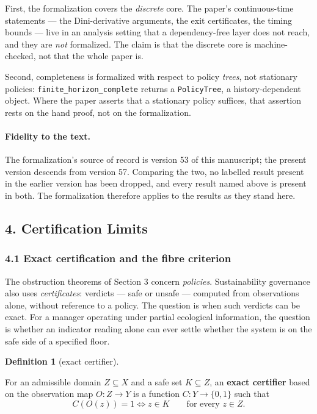 \documentclass[10pt,twocolumn]{article}
\theoremstyle{definition}
\newtheorem{definition}{Definition}
\begin{document}
First, the formalization covers the \emph{discrete} core. The paper's continuous-time
statements --- the Dini-derivative arguments, the exit certificates, the timing bounds
--- live in an analysis setting that a dependency-free layer does not reach, and they are
\emph{not} formalized. The claim is that the discrete core is machine-checked, not that
the whole paper is.

Second, completeness is formalized with respect to policy \emph{trees}, not stationary
policies: \texttt{finite\_horizon\_complete} returns a \texttt{PolicyTree}, a
history-dependent object. Where the paper asserts that a stationary policy suffices,
that assertion rests on the hand proof, not on the formalization.

\paragraph{Fidelity to the text.} The formalization's source of record is version 53 of
this manuscript; the present version descends from version 57. Comparing the two, no
labelled result present in the earlier version has been dropped, and every result named
above is present in both. The formalization therefore applies to the results as they
stand here.

\subsection{4. Certification Limits}\label{calc-certification-limits}

\subsubsection{4.1 Exact certification and the fibre
criterion}\label{calc-exact-certification-and-the-fibre-criterion}

The obstruction theorems of Section 3 concern \emph{policies}.
Sustainability governance also uses \emph{certificates}: verdicts
--- safe or unsafe --- computed from observations alone, without
reference to a policy. The question is when such verdicts can be exact.
For a manager operating under partial ecological information, the question is whether an indicator reading alone can ever settle whether the system is on the safe side of a specified floor.

\begin{definition}[exact certifier]\label{calc-def:certifier}

For an admissible domain
\(Z \subseteq X\) and a safe set \(K \subseteq Z\), an \textbf{exact
certifier} based on the observation map \(O : Z \to Y\) is a function
\(C : Y \to \{0,1\}\) such that
\[C(O(z)) = 1 \iff z \in K \qquad \text{for every } z \in Z.\]

\end{definition}
\end{document}
